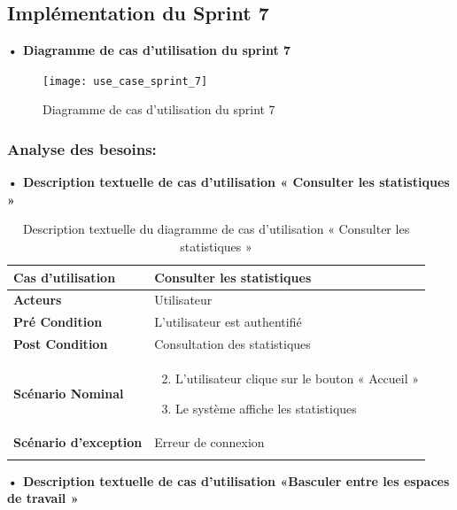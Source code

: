 \subsection{Implémentation du Sprint 7}
\textbf{•	Diagramme de cas d'utilisation du sprint 7}

\begin{figure}[H]
  \centering
  \texttt{[image: use\_case\_sprint\_7]}
  \caption{Diagramme de cas d'utilisation du sprint 7}
  \label{fig:UseCaseDiagramSp71}
\end{figure}

\subsubsection{Analyse des besoins:}
\textbf{•	Description textuelle de cas d'utilisation « Consulter les statistiques »}

\begin{longtable}{|p{5cm}|p{10cm}|}
\hline
\textbf{Cas d'utilisation}&Consulter les statistiques\\
\hline
\textbf{Acteurs}&Utilisateur\\
\hline
\textbf{Pré Condition}&L'utilisateur est authentifié\\
\hline
\textbf{Post Condition}&Consultation des statistiques\\
\hline
\textbf{Scénario Nominal}&
\vspace{-\baselineskip}
\begin{enumerate}
  \setcounter{enumi}{1}
      \item L'utilisateur clique sur le bouton « Accueil »
      \item  Le système affiche les statistiques
\end{enumerate}\\
\hline
\textbf{Scénario d'exception}&Erreur de connexion\\
\hline
\caption{Description textuelle du diagramme de cas d'utilisation « Consulter les statistiques »}
\label{tab:use_case_consulter_statistiques}
\end{longtable}

\textbf{•	Description textuelle de cas d'utilisation «Basculer entre les espaces de travail »}

